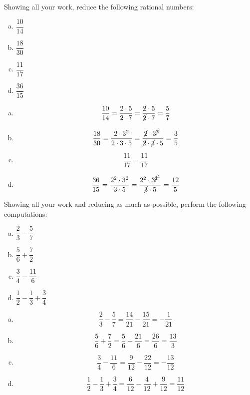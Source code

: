 \documentclass[11pt,letterpaper]{article}
\begin{document}
\newpage



 Showing all your work, reduce the following rational numbers:
	\begin{enumerate}[(a)]
	\item $\dfrac{10}{14}$
	\item $\dfrac{18}{30}$
	\item $\dfrac{11}{17}$
	\item $\dfrac{36}{15}$
	\end{enumerate} \pspace

\sol
\begin{enumerate}[(a)]
\item 
	\[
	\dfrac{10}{14}= \dfrac{2 \cdot 5}{2 \cdot 7}= \dfrac{\cancel{2} \cdot 5}{\cancel{2} \cdot 7}= \dfrac{5}{7}
	\] \pspace

\item 
	\[
	\dfrac{18}{30}= \dfrac{2 \cdot 3^2}{2 \cdot 3 \cdot 5}= \dfrac{\cancel{2} \cdot 3^{\cancel{2}^1}}{\cancel{2} \cdot \cancel{3} \cdot 5}= \dfrac{3}{5}
	\] \pspace

\item 
	\[
	\dfrac{11}{17}= \dfrac{11}{17}
	\] \pspace

\item 
	\[
	\dfrac{36}{15}= \dfrac{2^2 \cdot 3^2}{3 \cdot 5}= \dfrac{2^2 \cdot 3^{\cancel{2}^1}}{\cancel{3} \cdot 5}= \dfrac{12}{5}
	\]
\end{enumerate}



\newpage



 Showing all your work and reducing as much as possible, perform the following computations: 
	\begin{enumerate}[(a)]
	\item $\dfrac{2}{3} - \dfrac{5}{7}$
	\item $\dfrac{5}{6} + \dfrac{7}{2}$
	\item $\dfrac{3}{4} - \dfrac{11}{6}$
	\item $\dfrac{1}{2} - \dfrac{1}{3} + \dfrac{3}{4}$
	\end{enumerate} \pspace

\sol
\begin{enumerate}[(a)]
\item 
	\[
	\dfrac{2}{3} - \dfrac{5}{7}= \dfrac{14}{21} - \dfrac{15}{21}= -\dfrac{1}{21}
	\] \pspace

\item 
	\[
	\dfrac{5}{6} + \dfrac{7}{2}= \dfrac{5}{6} + \dfrac{21}{6}= \dfrac{26}{6}= \dfrac{13}{3}
	\] \pspace

\item 
	\[
	\dfrac{3}{4} - \dfrac{11}{6}= \dfrac{9}{12} - \dfrac{22}{12}= -\dfrac{13}{12}
	\] \pspace

\item 
	\[
	\dfrac{1}{2} - \dfrac{1}{3} + \dfrac{3}{4}= \dfrac{6}{12} - \dfrac{4}{12} + \dfrac{9}{12}= \dfrac{11}{12}
	\]
\end{enumerate}
\end{document}
